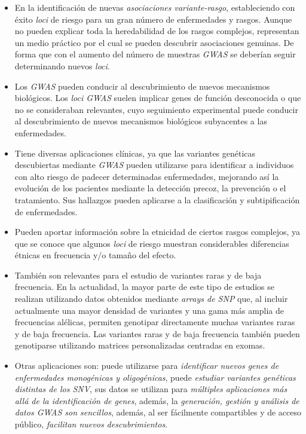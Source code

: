 \documentclass[IB,BIB]{TFUOC}%
\begin{document}
\begin{itemize}
    \item En la identificación de nuevas \textit{asociaciones variante-rasgo}, estableciendo con éxito \textit{loci} de riesgo para un gran número de enfermedades y rasgos. Aunque no pueden explicar toda la heredabilidad de los rasgos complejos, representan un medio práctico por el cual se pueden descubrir asociaciones genuinas. De forma que con el aumento del número de muestras \textit{GWAS} se deberían seguir determinando nuevos \textit{loci}.
    \item Los \textit{GWAS} pueden conducir al descubrimiento de nuevos mecanismos biológicos. Los \textit{loci GWAS} suelen implicar genes de función desconocida o que no se consideraban relevantes, cuyo seguimiento experimental puede conducir al descubrimiento de nuevos mecanismos biológicos subyacentes a las enfermedades.
    \item Tiene diversas aplicaciones clínicas, ya que las variantes genéticas descubiertas mediante \textit{GWAS} pueden utilizarse para identificar a individuos con alto riesgo de padecer determinadas enfermedades, mejorando así la evolución de los pacientes mediante la detección precoz, la prevención o el tratamiento. Sus hallazgos pueden aplicarse a la clasificación y subtipificación de enfermedades.
    \item Pueden aportar información sobre la etnicidad de ciertos rasgos complejos, ya que se conoce que algunos \textit{loci} de riesgo muestran considerables diferencias étnicas en frecuencia y/o tamaño del efecto.
    \item También son relevantes para el estudio de variantes raras y de baja frecuencia. En la actualidad, la mayor parte de este tipo de estudios se realizan utilizando datos obtenidos mediante \textit{arrays de SNP} que, al incluir actualmente una mayor densidad de variantes y una gama más amplia de frecuencias alélicas, permiten genotipar directamente muchas variantes raras y de baja frecuencia. Las variantes raras y de baja frecuencia también pueden genotiparse utilizando matrices personalizadas centradas en exomas.
    \item Otras aplicaciones son: puede utilizarse para \textit{identificar nuevos genes de enfermedades monogénicas y oligogénicas}, puede \textit{estudiar variantes genéticas distintas de los SNV}, sus datos se utilizan para \textit{múltiples aplicaciones más allá de la identificación de genes}, además, la \textit{generación, gestión y análisis de datos GWAS son sencillos}, además, al ser fácilmente compartibles y de acceso público, \textit{facilitan nuevos descubrimientos}.
\end{itemize}
\end{document}
